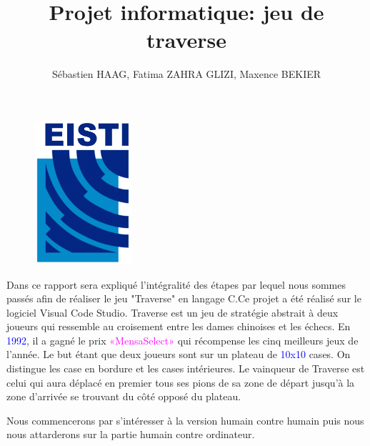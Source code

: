 \documentclass[20pt]{report}
\title{Projet informatique: jeu de traverse}
\author{Sébastien HAAG, Fatima ZAHRA GLIZI, Maxence BEKIER}
\makeatletter
\let\mytitle\@title
\let\myauthor\@author
\let\mydate\@date
\makeatother
\begin{document}
     
        \pagestyle{plain}
			\begin{titlepage}
			
      			\fontsize{21}{21}
      			
		  		\centering\Huge\mytitle \vspace{2\baselineskip}
		  	
		 		\centering \Large\myauthor \vspace{3\baselineskip}
		 		
		 		\centering\Large\mydate \vspace{3\baselineskip} 
					
					\begin{figure}[!b]
						 \includegraphics[scale=1.40]{logo_eisti.png}
					\end{figure}
					
			\end{titlepage}


		
      
 
     
      \Huge
      \vspace{0.5cm}
      \LARGE 
     
      \begin{flushleft}
      Dans ce rapport sera expliqué l'intégralité des étapes par lequel nous sommes passés afin de réaliser le jeu "Traverse" en langage C.Ce projet a été réalisé sur le logiciel Visual Code Studio. Traverse est un jeu de stratégie abstrait à deux joueurs qui ressemble au croisement entre les dames chinoises et les échecs. \newline
       En \textcolor{blue}{1992}, il a gagné le prix \textcolor{magenta}{«MensaSelect»} qui récompense les cinq meilleurs jeux de l'année.\newline
       Le but étant que deux joueurs sont sur un plateau de \textcolor{blue}{10x10} cases. On distingue les case en bordure et les cases intérieures. Le vainqueur de Traverse est celui qui aura déplacé en premier tous ses pions de  sa zone de départ jusqu'à la zone d'arrivée se trouvant du côté opposé du plateau.
       \vspace{0.5cm}
      
       Nous commencerons par s'intéresser à la version humain contre humain puis nous nous attarderons sur la partie humain contre ordinateur.

      
     \end{flushleft}
         
\end{document}
